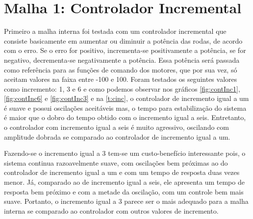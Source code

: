 \section{Malha 1: Controlador Incremental}
\label{m1ContInc}

Primeiro a malha interna foi testada com um controlador incremental que consiste basicamente em aumentar ou diminuir a potência das rodas, de acordo com o erro. Se o erro for positivo, incrementa-se positivamente a potência, se for negativo, decrementa-se negativamente a potência. Essa potência será passada como referência para as funções de comando dos motores, que por sua vez, só aceitam valores na faixa entre -100 e 100.%
Foram testados os seguintes valores como incremento: 1, 3 e 6 e como podemos observar nos gráficos \ref{fig:contInc1},\ref{fig:contInc6} e \ref{fig:contInc3} e na \autoref{t:cinc}, o controlador de incremento igual a um é suave e possui oscilações aceitáveis mas, o tempo para estabilização do sistema é maior que o dobro do tempo obtido com o incremento igual a seis. Entretanto, o controlador com incremento igual a seis é muito agressivo, oscilando com amplitude dobrada se comparado ao controlador de incremento igual a um. 

Fazendo-se o incremento igual a 3 tem-se um custo-benefício interessante pois, o sistema continua razoavelmente suave, com oscilações bem próximas ao do controlador de incremento igual a um e com um tempo de resposta %
duas vezes menor. Já, comparado ao de incremento igual a seis, ele apresenta um tempo de resposta bem próximo e com a metade da oscilação, com um controle bem mais suave. Portanto, o incremento igual a 3 parece ser o mais adequado para a malha interna se comparado ao controlador com outros valores de incremento. 

